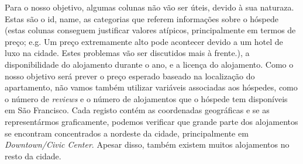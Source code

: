 \documentclass[justified, 11pt]{scrartcl}\usepackage[]{graphicx}\usepackage[]{xcolor}
\begin{document}
Para o nosso objetivo, algumas colunas não vão ser úteis, devido à sua naturaza. Estas são o id, name, as categorias que referem informações sobre o hóspede (estas colunas conseguem justificar valores atípicos, principalmente em termos de preço; e.g. Um preço extremamente alto pode acontecer devido a um hotel de luxo na cidade. Estes problemas vão ser discutidos mais à frente.), a disponibilidade do alojamento durante o ano, e a licença do alojamento. Como o nosso objetivo será prever o preço esperado baseado na localização do apartamento, não vamos também utilizar variáveis associadas aos hóspedes, como o número de \textit{reviews} e o número de alojamentos que o hóspede tem disponíveis em São Francisco. 
Cada registo contém as coordenadas geográficas e se as representármos graficamente, podemos verificar que grande parte dos alojamentos se encontram concentrados a nordeste da cidade, principalmente em \textit{Downtown/Civic Center}. Apesar disso, também existem muitos alojamentos no resto da cidade.
\end{document}

